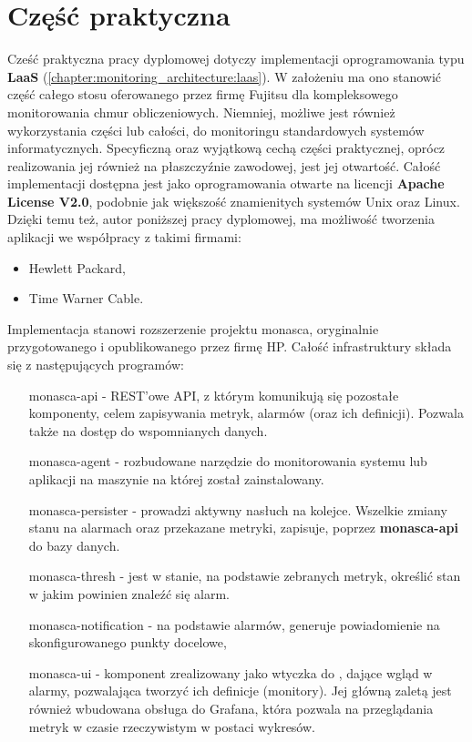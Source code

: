 \chapter{Część praktyczna}
\label{chapter:application}


Cześć praktyczna pracy dyplomowej dotyczy implementacji oprogramowania typu \textbf{LaaS} (\ref{chapter:monitoring_architecture:laas}).
W założeniu ma ono stanowić część całego stosu oferowanego przez firmę Fujitsu dla kompleksowego monitorowania chmur obliczeniowych.
Niemniej, możliwe jest również wykorzystania części lub całości, do monitoringu standardowych systemów informatycznych. 
Specyficzną oraz wyjątkową cechą części praktycznej, oprócz realizowania jej również na płaszczyźnie zawodowej, jest jej otwartość.
Całość implementacji dostępna jest jako oprogramowania otwarte na licencji \textbf{Apache License V2.0}, podobnie jak większość
znamienitych systemów Unix oraz Linux. Dzięki temu też, autor poniższej pracy dyplomowej, ma możliwość tworzenia aplikacji
we współpracy z takimi firmami:
\begin{itemize}
    \item Hewlett Packard,
    \item Time Warner Cable.
\end{itemize}

Implementacja stanowi rozszerzenie projektu monasca, oryginalnie przygotowanego i opublikowanego przez firmę HP.
Całość infrastruktury składa się z następujących programów:
\begin{itemize}
    \item[monasca-api] - REST'owe API, z którym komunikują się pozostałe komponenty, celem zapisywania metryk, alarmów (oraz ich definicji).
    Pozwala także na dostęp do wspomnianych danych.
    \item[monasca-agent] - rozbudowane narzędzie do monitorowania systemu lub aplikacji na maszynie na której został zainstalowany.
    \item[monasca-persister] - prowadzi aktywny nasłuch na kolejce. Wszelkie zmiany stanu na alarmach oraz przekazane metryki, zapisuje,
    poprzez \textbf{monasca-api} do bazy danych.
    \item[monasca-thresh] - jest w stanie, na podstawie zebranych metryk, określić stan w jakim powinien znaleźć się alarm.
    \item[monasca-notification] - na podstawie alarmów, generuje powiadomienie na skonfigurowanego punkty docelowe,
    \item[monasca-ui] - komponent zrealizowany jako wtyczka do , dające wgląd w alarmy, pozwalająca tworzyć ich definicje (monitory).
    Jej główną zaletą jest również wbudowana obsługa do Grafana, która pozwala na przeglądania metryk w czasie rzeczywistym w postaci wykresów.
\end{itemize}

